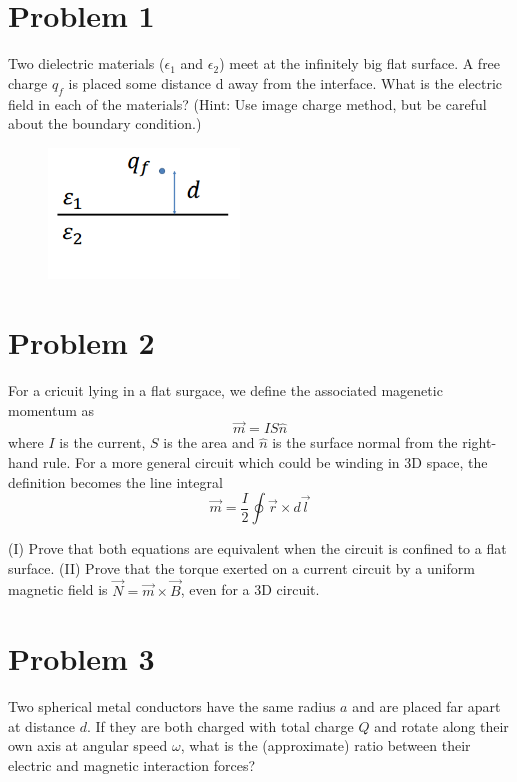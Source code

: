 \documentclass[a4paper,12pt]{article}
\newcommand{\V}[1]{\ensuremath{\vec{#1}}}
\newcommand{\F}[2]{\ensuremath{\frac{#1}{#2}}}
\newcommand{\Q}[1]{\newpage \section*{#1}}
\begin{document}
\section{Problem 1}
Two dielectric materials ($\epsilon_1$ and $\epsilon_2$) meet at the infinitely big flat surface.  A free charge $q_f$ is placed some distance d away from the interface.  What is the electric field in each of the materials? (Hint: Use image charge method, but be careful about the boundary condition.)
\begin{figure}[h]
\centering
\includegraphics[width=2in]{dielectric_free_charge.png}
\end{figure}


\Q{Problem 2}
For a cricuit lying in a flat surgace, we define the associated magenetic momentum as \[\V{m}=IS\hat{n}\] where $I$ is the current, $S$ is the area and $\hat{n}$ is the surface normal from the right-hand rule.  For a more general circuit which could be winding in 3D space, the definition becomes the line integral \[\V{m}=\F{I}{2}\oint\V{r}\times d\V{l}\]

(I) Prove that both equations are equivalent when the circuit is confined to a flat surface. (II) Prove that the torque exerted on a current circuit by a uniform magnetic field is $\V{N}=\V{m}\times\V{B}$, even for a 3D circuit.

\Q{Problem 3}
Two spherical metal conductors have the same radius $a$ and are placed far apart at distance $d$. If they are both charged with total charge $Q$ and rotate along their own axis at angular speed $\omega$, what is the (approximate) ratio between their electric and magnetic interaction forces?
\end{document}
